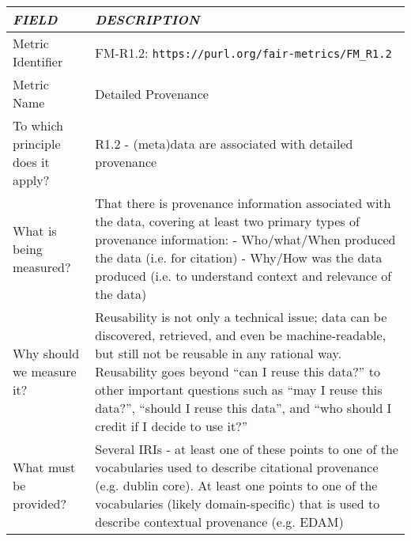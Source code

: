 \documentclass[english]{article}
\begin{document}
\begin{longtable}{|p{5cm}|p{9cm}|}


\hline
\emph{FIELD} & \emph{DESCRIPTION} \\
\hline
Metric Identifier &   FM-R1.2: \verb"https://purl.org/fair-metrics/FM_R1.2"
\\


\hline
Metric Name &   


Detailed Provenance


 \\



\hline
To which principle does it apply? &   


R1.2 - (meta)data are associated with detailed provenance

\\



\hline
What is being measured? & 


That there is provenance information associated with the data, covering at least two primary types of provenance information:\newline 
\newline 
- Who/what/When produced the data (i.e. for citation)\newline 
- Why/How was the data produced (i.e. to understand context and relevance of the data)

\\



\hline
Why should we measure it? & 


Reusability is not only a technical issue; data can be discovered, retrieved, and even be machine-readable, but still not be reusable in any rational way.  Reusability goes beyond “can I reuse this data?” to other important questions such as “may I reuse this data?”, “should I reuse this data”, and “who should I credit if I decide to use it?”


  
\\



\hline
What must be provided? &  


Several IRIs -  at least one of these points to one of the vocabularies used to describe citational provenance (e.g. dublin core).  At least one points to one of the vocabularies (likely domain-specific) that is used to describe contextual provenance (e.g. EDAM)



\end{longtable}
\end{document}
